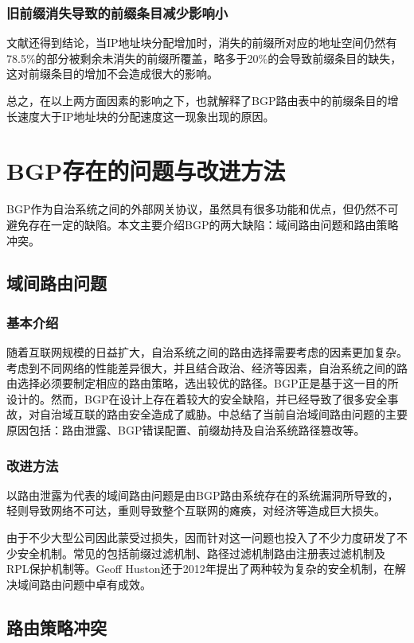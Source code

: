 \documentclass[11pt,twocolumn]{article}
\begin{document}
\subsubsection{旧前缀消失导致的前缀条目减少影响小}

文献\cite{Impact}还得到结论，当IP地址块分配增加时，消失的前缀所对应的地址空间仍然有78.5\%的部分被剩余未消失的前缀所覆盖，略多于20\%的会导致前缀条目的缺失，这对前缀条目的增加不会造成很大的影响。

总之，在以上两方面因素的影响之下，也就解释了BGP路由表中的前缀条目的增长速度大于IP地址块的分配速度这一现象出现的原因。

\section{BGP存在的问题与改进方法}
BGP作为自治系统之间的外部网关协议，虽然具有很多功能和优点，但仍然不可避免存在一定的缺陷。本文主要介绍BGP的两大缺陷：域间路由问题和路由策略冲突。

\subsection{域间路由问题}
\subsubsection{基本介绍}
随着互联网规模的日益扩大，自治系统之间的路由选择需要考虑的因素更加复杂。考虑到不同网络的性能差异很大，并且结合政治、经济等因素，自治系统之间的路由选择必须要制定相应的路由策略，选出较优的路径。BGP正是基于这一目的所设计的。然而，BGP在设计上存在着较大的安全缺陷，并已经导致了很多安全事故，对自治域互联的路由安全造成了威胁。\cite{Leak}中总结了当前自治域间路由问题的主要原因包括：路由泄露、BGP错误配置、前缀劫持及自治系统路径篡改等。

\subsubsection{改进方法}
以路由泄露为代表的域间路由问题是由BGP路由系统存在的系统漏洞所导致的，轻则导致网络不可达，重则导致整个互联网的瘫痪，对经济等造成巨大损失。

由于不少大型公司因此蒙受过损失，因而针对这一问题也投入了不少力度研发了不少安全机制。常见的包括前缀过滤机制、路径过滤机制路由注册表过滤机制及RPL保护机制等\cite{Security}。Geoff Huston还于2012年提出了两种较为复杂的安全机制，在解决域间路由问题中卓有成效。

\subsection{路由策略冲突}
\end{document}
